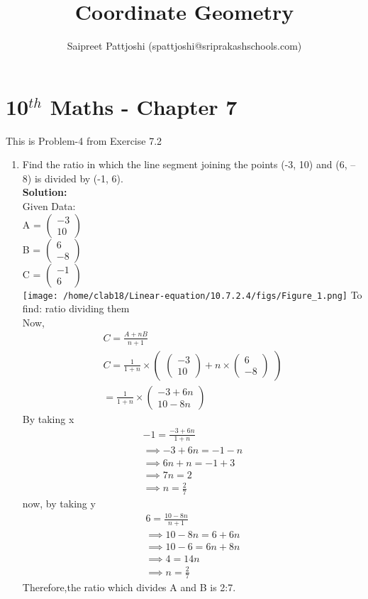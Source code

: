 \documentclass[12pt]{article}
\title{Coordinate Geometry}
\author{Saipreet Pattjoshi (spattjoshi@sriprakashschools.com)}
\newcommand{\myvec}[1]{\ensuremath{\begin{pmatrix}#1\end{pmatrix}}}
\newcommand{\solution}{\noindent \textbf{Solution: }}
\begin{document}
\maketitle
\section*{10$^{th}$ Maths - Chapter 7}
This is Problem-4 from Exercise 7.2
\begin{enumerate}
\item  Find the ratio in which the line segment joining the points (-3, 10) and (6, – 8) is divided by (-1, 6).  \\
\solution \\
Given Data:\\
           A = \myvec{-3\\10}\\
           B = \myvec{6\\-8}\\
           C = \myvec{-1\\6}\\
           \texttt{[image: /home/clab18/Linear-equation/10.7.2.4/figs/Figure\_1.png]}
To find: ratio dividing them\\
Now, 
\begin{align}
C = \frac{A+nB}{n+1}\\
C = \frac{1}{1+n} \times \myvec{\myvec{-3\\10}+n\times \myvec{6\\-8}}\\
= \frac{1}{1+n} \times \myvec{-3+6n\\10-8n}
\end{align}
By taking x
\begin{align}
-1= \frac{-3+6n}{1+n}\\
\implies -3+6n=-1-n\\
\implies 6n+n =-1+3\\
 \implies 7n=2\\
 \implies n=\frac{2}{7}
\end{align}	
now, by taking y 
\begin{align}
6= \frac{10-8n}{n+1}\\
\implies 10-8n=6+6n\\
\implies 10-6=6n+8n\\
\implies 4=14n\\
\implies n=\frac{2}{7}
\end{align}
Therefore,the ratio which divides A and B is 2:7.\\
\end{enumerate}
\end{document}
